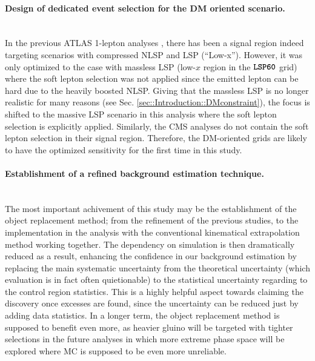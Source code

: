 \paragraph{Design of dedicated event selection for the DM oriented scenario.} \mbox{} \\
In the previous ATLAS 1-lepton analyses \cite{strong1L_ICHEP2016_CONF}\cite{strong1L_3p2fb_paper}, there has been a signal region indeed targeting scenarios with compressed NLSP and LSP (``Low-x''). However, it was only optimized to the case with massless LSP (low-$x$ region in the $\mathrm{\textbf{\texttt{LSP60}}}$ grid) where the soft lepton selection was not applied since the emitted lepton can be hard due to the heavily boosted NLSP. Giving that the massless LSP is no longer realistic for many reasons (see Sec. \ref{sec::Introduction::DMconstraint}), the focus is shifted to the massive LSP scenario in this analysis where the soft lepton selection is explicitly applied. Similarly, the CMS analyses do not contain the soft lepton selection in their signal region. Therefore, the DM-oriented grids are likely to have the optimized sensitivity for the first time in this study. \\



\paragraph{Establishment of a refined background estimation technique.} \mbox{} \\
The most important achivement of this study may be the establishment of the object replacement method; 
from the refinement of the previous studies, to the implementation in the analysis with the conventional kinematical extrapolation method working together.
The dependency on simulation is then dramatically reduced as a result, 
enhancing the confidence in our background estimation 
by replacing the main systematic uncertainty from the theoretical uncertainty (which evaluation is in fact often quietionable) to the statistical uncertainty regarding to the control region statistics.
This is a highly helpful aspect towards claiming the discovery once excesses are found, since the uncertainty can be reduced just by adding data statistics. In a longer term, the object replacement method is supposed to benefit even more,
as heavier gluino will be targeted with tighter selections in the future analyses
in which more extreme phase space will be explored where MC is supposed to be even more unreliable. \\

